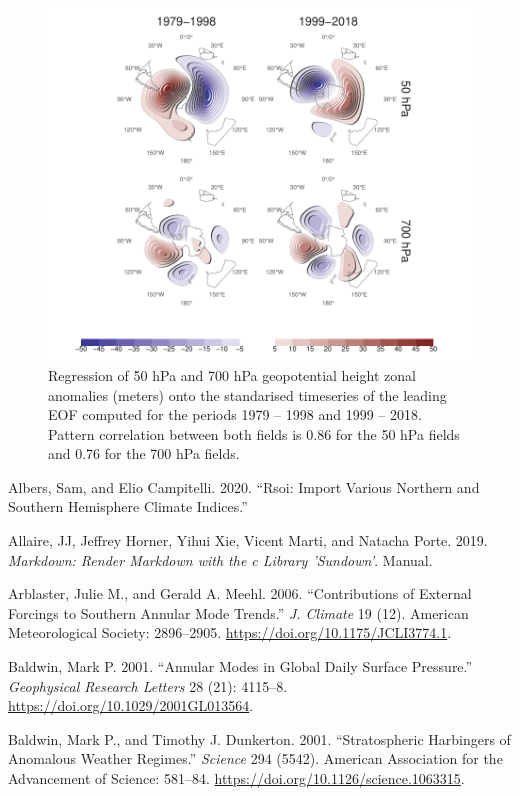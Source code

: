 \documentclass[smallextended]{svjour3}       %
\begin{document}
\begin{figure}
\includegraphics{A6-1} \caption{Regression of 50 hPa and 700 hPa geopotential height zonal anomalies (meters) onto the standarised timeseries of the leading EOF computed for the periods 1979 -- 1998 and 1999 -- 2018. Pattern correlation between both fields is 0.86 for the 50 hPa fields and 0.76 for the 700 hPa fields.}\label{fig:A6}
\end{figure}

\hypertarget{refs}{}
\leavevmode\hypertarget{ref-albers2020}{}%
Albers, Sam, and Elio Campitelli. 2020. ``Rsoi: Import Various Northern and Southern Hemisphere Climate Indices.''

\leavevmode\hypertarget{ref-allaire2019}{}%
Allaire, JJ, Jeffrey Horner, Yihui Xie, Vicent Marti, and Natacha Porte. 2019. \emph{Markdown: Render Markdown with the c Library 'Sundown'}. Manual.

\leavevmode\hypertarget{ref-arblaster2006}{}%
Arblaster, Julie M., and Gerald A. Meehl. 2006. ``Contributions of External Forcings to Southern Annular Mode Trends.'' \emph{J. Climate} 19 (12). American Meteorological Society: 2896--2905. \url{https://doi.org/10.1175/JCLI3774.1}.

\leavevmode\hypertarget{ref-baldwin2001a}{}%
Baldwin, Mark P. 2001. ``Annular Modes in Global Daily Surface Pressure.'' \emph{Geophysical Research Letters} 28 (21): 4115--8. \url{https://doi.org/10.1029/2001GL013564}.

\leavevmode\hypertarget{ref-baldwin2001}{}%
Baldwin, Mark P., and Timothy J. Dunkerton. 2001. ``Stratospheric Harbingers of Anomalous Weather Regimes.'' \emph{Science} 294 (5542). American Association for the Advancement of Science: 581--84. \url{https://doi.org/10.1126/science.1063315}.
\end{document}
